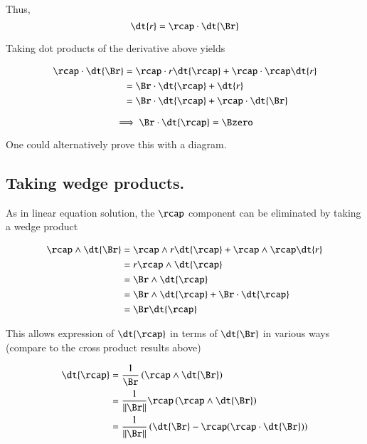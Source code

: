 Thus,
\[
\dt{r} = \rcap \cdot \dt{\Br}
\]

Taking dot products of the derivative above yields

\begin{align*}
\rcap \cdot \dt{\Br} &= \rcap \cdot r \dt{\rcap} + \rcap \cdot \rcap \dt{r} \\
                            &= \Br \cdot \dt{\rcap} + \dt{r} \\
                            &= \Br \cdot \dt{\rcap} + \rcap \cdot \dt{\Br}
\end{align*}

\[
\implies
\Br \cdot \dt{\rcap} = \Bzero
\]

One could alternatively prove this with a diagram.


\subsection{Taking wedge products.}

As in linear equation solution, the $\rcap$ component can be eliminated by taking a wedge product

\begin{align*}
\rcap \wedge \dt{\Br} &= \rcap \wedge r \dt{\rcap} + \rcap \wedge \rcap \dt{r} \\
                             &= r \rcap \wedge \dt{\rcap} \\
                             &= \Br \wedge \dt{\rcap}  \\
                             &= \Br \wedge \dt{\rcap} + \Br \cdot \dt{\rcap} \\
                             &= \Br \dt{\rcap}
\end{align*}

This allows expression of $\dt{\rcap}$ in terms of $\dt{\Br}$ in various ways (compare to the cross product results above)

\begin{align*}
\dt{\rcap} &= \frac{1}{{ \Br }}\left(\rcap \wedge \dt{\Br}\right) \\
                   &= \frac{1}{\Vert \Br \Vert}{     {\rcap} \left(\rcap \wedge \dt{\Br}\right)       } \\
                   &= \frac{1}{\Vert \Br \Vert}\left({ \dt{\Br} - \rcap (\rcap \cdot \dt{\Br}) }\right) \\
\end{align*}

